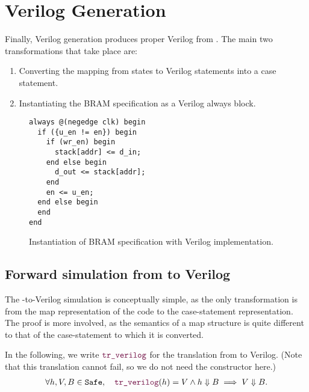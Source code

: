 
\section{Verilog Generation}%
\label{sec:hg:verilog-generation}

Finally, Verilog generation produces proper Verilog from \htl{}.  The main two
transformations that take place are:

\begin{enumerate}
\item Converting the mapping from states to Verilog statements into a case
  statement.
\item Instantiating the \gls{BRAM} specification as a Verilog always block.
\end{enumerate}

\begin{figure}
  \centering
\begin{verbatim}
always @(negedge clk) begin
  if ({u_en != en}) begin
    if (wr_en) begin
      stack[addr] <= d_in;
    end else begin
      d_out <= stack[addr];
    end
    en <= u_en;
  end else begin
  end
end
\end{verbatim}
  \caption{Instantiation of \gls{BRAM} specification with Verilog implementation.}%
  \label{fig:hg:ram-instantiation}
\end{figure}

\subsection{Forward simulation from \htl{} to Verilog}%
\label{sec:proof:htl_verilog}

The \htl{}-to-Verilog simulation is conceptually simple, as the only
transformation is from the map representation of the code to the case-statement
representation.  The proof is more involved, as the semantics of a map structure
is quite different to that of the case-statement to which it is converted.

\begin{lemma}\label{lemma:verilog}
  In the following, we write $\yhfunction{tr\_verilog}$ for the translation from
  \htl{} to Verilog. (Note that this translation cannot fail, so we do not need the
   constructor here.)
  {\normalfont
    \begin{align*}
      \forall h, V, B \in \texttt{Safe},\quad \yhfunction{tr\_verilog} (h) = V \land h \Downarrow B \implies V \Downarrow B.
    \end{align*}}
\end{lemma}

